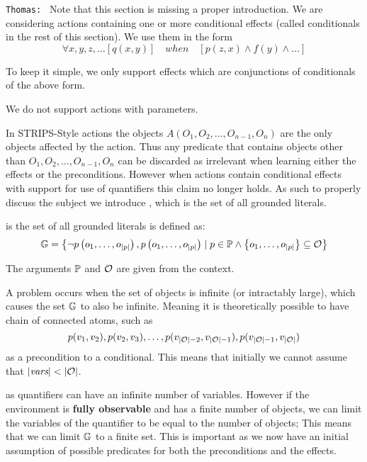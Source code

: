 \documentclass[\master/Master.tex]{subfiles}
\begin{document}
\texttt{Thomas: } Note that this section is missing a proper introduction. We are considering actions containing one or more conditional effects (called conditionals in the rest of this section). We use them in the form 
\begin{equation*}
    \forall x, y, z, \dots \left[ q(x, y) \right] \quad when \quad 
        \left[ p(z, x) \land f(y) \land \dots \right]
\end{equation*}

To keep it simple, we only support effects which are conjunctions of conditionals of the above form.

We do not support actions with parameters.


In STRIPS-Style actions the objects $A(O_1,O_2,\ldots,O_{n-1},O_n)$ are the only objects affected by the action.
Thus any predicate that contains objects other than $O_1,O_2,\ldots,O_{n-1},O_n$ can be discarded as irrelevant when learning either the effects or the preconditions.
However when actions contain conditional effects with support for use of quantifiers this claim no longer holds.
As such to properly discuss the subject we introduce \glits, which is the set of all grounded literals.
\begin{definition}
	\glits is the set of all grounded literals is defined as:
	\begin{equation*}
		\mathbb{G} =
		\left\{ \neg p\left(o_1, \dots, o_{|p|}\right), 
				p\left(o_1, \dots, o_{|p|}\right) 
				\mid 
		p \in \mathbb{P} \land 
		\left\{o_1, \dots, o_{|p|} \right\} \subseteq \mathcal{O}
		\right\}
	\end{equation*}
	
	The arguments $\mathbb{P}$ and $\mathcal{O}$ are given from the context.
\end{definition}

A problem occurs when the set of objects \objs is infinite (or intractably large), which causes the set $\mathbb{G}$ to also be infinite.
Meaning it is theoretically possible to have chain of connected atoms, such as 
\begin{equation*}
	p(v_1,v_2), p(v_2,v_3),\dots, p(v_{|\mathcal{O}|-2},v_{|\mathcal{O}|-1}), p(v_{|\mathcal{O}|-1},v_{|\mathcal{O}|})
\end{equation*}
 as a precondition to a conditional.
This means that initially we cannot assume that $|\textit{vars}| < |\mathcal{O}|$.

as quantifiers can have an infinite number of variables.
However if the environment is \textbf{fully observable} and has a finite number of objects,
we can limit the variables of the quantifier to be equal to the number of objects; This means that we can limit $\mathbb{G}$ to a finite set.
This is important as we now have an initial assumption of possible predicates for both the preconditions and the effects.
\end{document}
